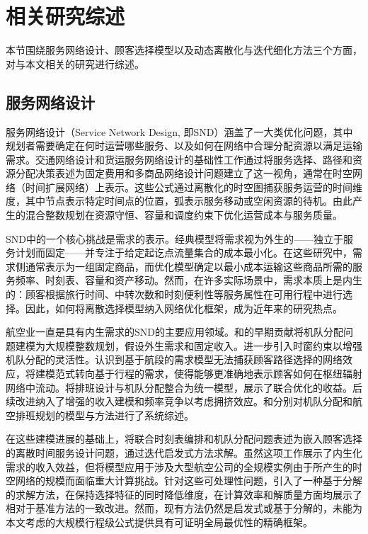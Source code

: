 \section{相关研究综述}
\label{sec:literature_review}

本节围绕服务网络设计、顾客选择模型以及动态离散化与迭代细化方法三个方面，对与本文相关的研究进行综述。

\subsection{服务网络设计}

服务网络设计（Service Network Design, 即SND）涵盖了一大类优化问题，其中规划者需要确定在何时运营哪些服务、以及如何在网络中合理分配资源以满足运输需求。交通网络设计和货运服务网络设计的基础性工作通过将服务选择、路径和资源分配决策表述为固定费用和多商品网络设计问题建立了这一视角，通常在时空网络（时间扩展网络）上表示\citep{magnanti1984network, crainic1986multicommodity, crainic1997planning, crainic2000service, wieberneit2008service}。这些公式通过离散化的时空图捕获服务运营的时间维度，其中节点表示特定时间点的位置，弧表示服务移动或空闲资源的待机。由此产生的混合整数规划在资源守恒、容量和调度约束下优化运营成本与服务质量。

SND中的一个核心挑战是需求的表示。经典模型将需求视为外生的——独立于服务计划而固定——并专注于给定起讫点流量集合的成本最小化\citep{crainic2000service, andersen2009service, andersen2011branch, boland2017continuous}。在这些研究中，需求侧通常表示为一组固定商品，而优化模型确定以最小成本运输这些商品所需的服务频率、时刻表、容量和资产移动。然而，在许多实际场景中，需求本质上是内生的：顾客根据旅行时间、中转次数和时刻便利性等服务属性在可用行程中进行选择。因此，如何将离散选择模型纳入网络优化框架，成为近年来的研究热点。

航空业一直是具有内生需求的SND的主要应用领域。\citet{abara1989applying}和\citet{hane1995fleet}的早期贡献将机队分配问题建模为大规模整数规划，假设外生需求和固定收入。\citet{rexing2000airline}进一步引入时窗约束以增强机队分配的灵活性。认识到基于航段的需求模型无法捕获顾客路径选择的网络效应，\citet{barnhart2002itinerary}将建模范式转向基于行程的需求，使得能够更准确地表示顾客如何在枢纽辐射网络中流动。\citet{lohatepanont2004airline}将排班设计与机队分配整合为统一模型，展示了联合优化的收益。后续改进纳入了增强的收入建模\citep{barnhart2009airline}和频率竞争以考虑拥挤效应\citep{vaze2012modeling}。\citet{sherali2006fleet}和\citet{eltoukhy2017airline}分别对机队分配和航空排班规划的模型与方法进行了系统综述。

在这些建模进展的基础上，\citet{wei2020airline}将联合时刻表编排和机队分配问题表述为嵌入顾客选择的离散时间服务设计问题，通过迭代启发式方法求解。虽然这项工作展示了内生化需求的收入效益，但将模型应用于涉及大型航空公司的全规模实例由于所产生的时空网络的规模而面临重大计算挑战。针对这些可处理性问题，\citet{yan2022choice}引入了一种基于分解的求解方法，在保持选择特征的同时降低维度，在计算效率和解质量方面均展示了相对于基准方法的一致改进。然而，现有方法仍然是启发式或基于分解的，未能为本文考虑的大规模行程级公式提供具有可证明全局最优性的精确框架。

